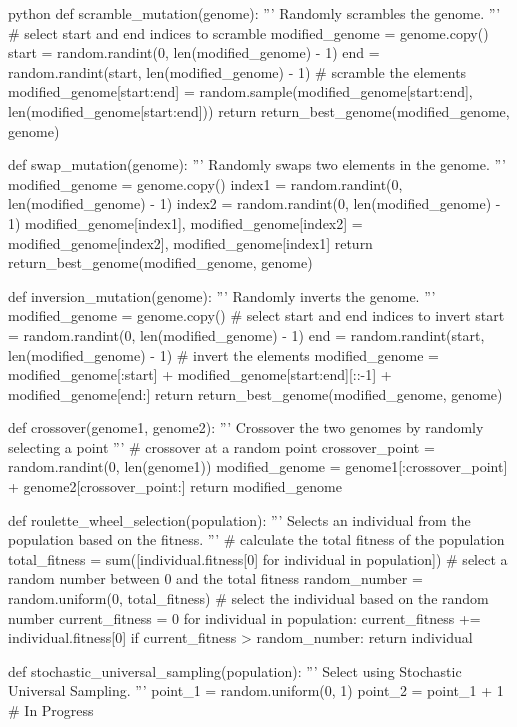 \begin{mintedbox}{python}
def scramble_mutation(genome):
    '''
    Randomly scrambles the genome.
    '''
    # select start and end indices to scramble
    modified_genome = genome.copy()
    start = random.randint(0, len(modified_genome) - 1)
    end = random.randint(start, len(modified_genome) - 1)
    # scramble the elements
    modified_genome[start:end] = random.sample(modified_genome[start:end], len(modified_genome[start:end]))
    return return_best_genome(modified_genome, genome)

def swap_mutation(genome):
    '''
    Randomly swaps two elements in the genome.
    '''
    modified_genome = genome.copy()
    index1 = random.randint(0, len(modified_genome) - 1)
    index2 = random.randint(0, len(modified_genome) - 1)
    modified_genome[index1], modified_genome[index2] = modified_genome[index2], modified_genome[index1]
    return return_best_genome(modified_genome, genome)

def inversion_mutation(genome):
    '''
    Randomly inverts the genome.
    '''
    modified_genome = genome.copy()
    # select start and end indices to invert
    start = random.randint(0, len(modified_genome) - 1)
    end = random.randint(start, len(modified_genome) - 1)
    # invert the elements
    modified_genome = modified_genome[:start] + modified_genome[start:end][::-1] + modified_genome[end:]
    return return_best_genome(modified_genome, genome)

def crossover(genome1, genome2):
    '''
    Crossover the two genomes by randomly selecting a point
    '''
    # crossover at a random point
    crossover_point = random.randint(0, len(genome1))
    modified_genome = genome1[:crossover_point] + genome2[crossover_point:]
    return modified_genome

def roulette_wheel_selection(population):
    '''
    Selects an individual from the population based on the fitness.
    '''
    # calculate the total fitness of the population
    total_fitness = sum([individual.fitness[0] for individual in population])
    # select a random number between 0 and the total fitness
    random_number = random.uniform(0, total_fitness)
    # select the individual based on the random number
    current_fitness = 0
    for individual in population:
        current_fitness += individual.fitness[0]
        if current_fitness > random_number:
            return individual

def stochastic_universal_sampling(population):
    '''
    Select using Stochastic Universal Sampling.
    '''
    point_1 = random.uniform(0, 1)
    point_2 = point_1 + 1
    # In Progress


\end{mintedbox}
